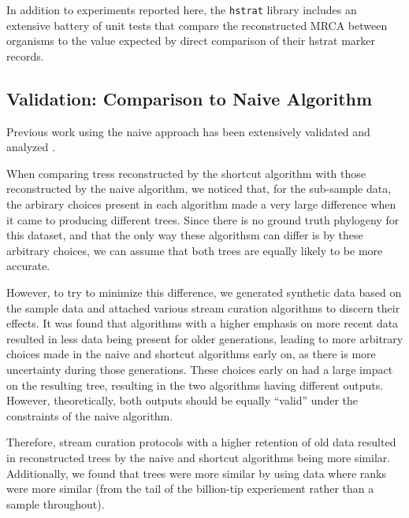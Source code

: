 In addition to experiments reported here, the \texttt{hstrat} library includes an extensive battery of unit tests that compare the reconstructed MRCA between organisms to the value expected by direct comparison of their hstrat marker records.

\subsection{Validation: Comparison to Naive Algorithm}

Previous work using the naive approach has been extensively validated and analyzed \citep{moreno2025testing}.

When comparing tress reconstructed by the shortcut algorithm with those reconstructed by the naive algorithm, we noticed that, for the sub-sample data, the arbirary choices present in each algorithm made a very large difference when it came to producing different trees.
Since there is no ground truth phylogeny for this dataset, and that the only way these algorithsm can differ is by these arbitrary choices, we can assume that both trees are equally likely to be more accurate.

However, to try to minimize this difference, we generated synthetic data based on the sample data and attached various stream curation algorithms to discern their effects.
It was found that algorithms with a higher emphasis on more recent data resulted in less data being present for older generations, leading to more arbitrary choices made in the naive and shortcut algorithms early on, as there is more uncertainty during those generations.
These choices early on had a large impact on the resulting tree, resulting in the two algorithms having different outputs. However, theoretically, both outputs should be equally ``valid'' under the constraints of the naive algorithm. 

Therefore, stream curation protocols with a higher retention of old data resulted in reconstructed trees by the naive and shortcut algorithms being more similar. Additionally, we found that trees were more similar by using data where ranks were more similar (from the tail of the billion-tip experiement rather than a sample throughout).

